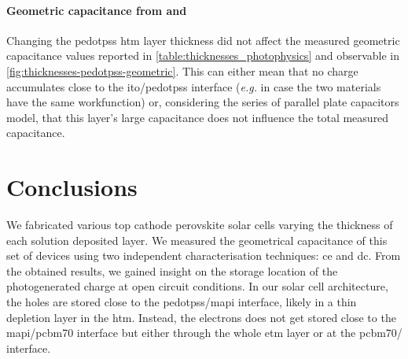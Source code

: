 	\paragraph{Geometric capacitance from  and }
	Changing the \gls{pedotpss} \gls{htm} layer thickness did not affect the measured geometric capacitance values reported in \cref{table:thicknesses_photophysics} and observable in \cref{fig:thicknesses-pedotpss-geometric}.
	This can either mean that no charge accumulates close to the \gls{ito}\-/\gls{pedotpss} interface (\textsl{e.g.} in case the two materials have the same workfunction) or, considering the series of parallel plate capacitors model, that this layer's large capacitance does not influence the total measured capacitance.


\section{Conclusions}
We fabricated various top cathode perovskite solar cells varying the thickness of each solution deposited layer.
We measured the geometrical capacitance of this set of devices using two independent characterisation techniques: \gls{ce} and \gls{dc}.
From the obtained results, we gained insight on the storage location of the photogenerated charge at open circuit conditions.
In our solar cell architecture, the holes are stored close to the \gls{pedotpss}\-/\gls{mapi} interface, likely in a thin depletion layer in the \gls{htm}.
Instead, the electrons does not get stored close to the \gls{mapi}\-/\gls{pcbm70} interface but either through the whole \gls{etm} layer or at the \gls{pcbm70}\-/ interface.



